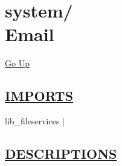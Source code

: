 \chapter*{\color{headfile}
{\large system\slash\hspace{0pt}}
 \\
Email
}
\hypertarget{ecldoc:toc:system.Email}{}
\hyperlink{ecldoc:toc:root/system}{Go Up}

\section*{\underline{\textsf{IMPORTS}}}
\begin{doublespace}
{\large
lib\_fileservices |
}
\end{doublespace}

\section*{\underline{\textsf{DESCRIPTIONS}}}
